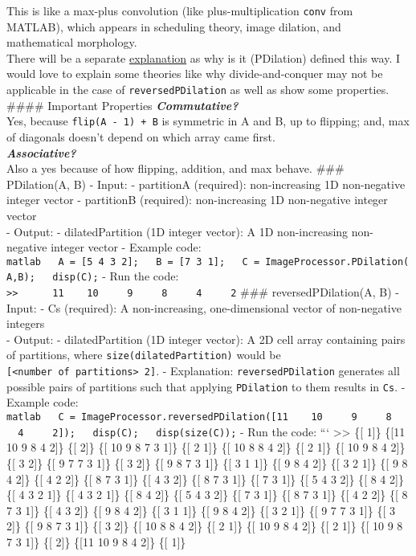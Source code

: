 \documentclass[11pt]{amsart}
\theoremstyle{remark}
\theoremstyle{definition}
\theoremstyle{remark}
\numberwithin{equation}{section}
\begin{document}
This is like a max-plus convolution (like plus-multiplication
\texttt{conv} from MATLAB), which appears in scheduling theory, image
dilation, and mathematical morphology.\\
There will be a separate
\href{https://github.com/zedttxj/Image-Processing-Tool-with-Matlab/blob/main/optional/PDilation-reversedPDilation.md}{explanation}
as why is it (PDilation) defined this way. I would love to explain some
theories like why divide-and-conquer may not be applicable in the case
of \texttt{reversedPDilation} as well as show some properties. \#\#\#\#
Important Properties \textbf{\emph{Commutative?}}\\
Yes, because \texttt{flip(A\ -\ 1)\ +\ B\textquotesingle{}} is symmetric
in A and B, up to flipping; and, max of diagonals doesn't depend on
which array came first.\\
\textbf{\emph{Associative?}}\\
Also a yes because of how flipping, addition, and max behave. \#\#\#
PDilation(A, B) - Input: - partitionA (required): non-increasing 1D
non-negative integer vector - partitionB (required): non-increasing 1D
non-negative integer vector\\
- Output: - dilatedPartition (1D integer vector): A 1D non-increasing
non-negative integer vector - Example code:
\texttt{matlab\ \ \ A\ =\ {[}5\ 4\ 3\ 2{]};\ \ \ B\ =\ {[}7\ 3\ 1{]};\ \ \ C\ =\ ImageProcessor.PDilation(A,B);\ \ \ disp(C);}
- Run the code:
\texttt{\textgreater{}\textgreater{}\ \ \ \ \ \ 11\ \ \ \ 10\ \ \ \ \ 9\ \ \ \ \ 8\ \ \ \ \ 4\ \ \ \ \ 2}
\#\#\# reversedPDilation(A, B) - Input: - Cs (required): A
non-increasing, one-dimensional vector of non-negative integers\\
- Output: - dilatedPartition (1D integer vector): A 2D cell array
containing pairs of partitions, where \texttt{size(dilatedPartition)}
would be
\texttt{{[}\textless{}number\ of\ partitions\textgreater{}\ 2{]}}. -
Explanation: \texttt{reversedPDilation} generates all possible pairs of
partitions such that applying \texttt{PDilation} to them results in
\texttt{Cs}. - Example code:
\texttt{matlab\ \ \ C\ =\ ImageProcessor.reversedPDilation({[}11\ \ \ \ 10\ \ \ \ \ 9\ \ \ \ \ 8\ \ \ \ \ 4\ \ \ \ \ 2{]});\ \ \ disp(C);\ \ \ disp(size(C));}
- Run the code: ``` \textgreater\textgreater{} \{{[} 1{]}\} \{{[}11 10 9
8 4 2{]}\} \{{[} 2{]}\} \{{[} 10 9 8 7 3 1{]}\} \{{[} 2 1{]}\} \{{[} 10
8 8 4 2{]}\} \{{[} 2 1{]}\} \{{[} 10 9 8 4 2{]}\} \{{[} 3 2{]}\} \{{[} 9
7 7 3 1{]}\} \{{[} 3 2{]}\} \{{[} 9 8 7 3 1{]}\} \{{[} 3 1 1{]}\} \{{[}
9 8 4 2{]}\} \{{[} 3 2 1{]}\} \{{[} 9 8 4 2{]}\} \{{[} 4 2 2{]}\} \{{[}
8 7 3 1{]}\} \{{[} 4 3 2{]}\} \{{[} 8 7 3 1{]}\} \{{[} 7 3 1{]}\} \{{[}
5 4 3 2{]}\} \{{[} 8 4 2{]}\} \{{[} 4 3 2 1{]}\} \{{[} 4 3 2 1{]}\}
\{{[} 8 4 2{]}\} \{{[} 5 4 3 2{]}\} \{{[} 7 3 1{]}\} \{{[} 8 7 3 1{]}\}
\{{[} 4 2 2{]}\} \{{[} 8 7 3 1{]}\} \{{[} 4 3 2{]}\} \{{[} 9 8 4 2{]}\}
\{{[} 3 1 1{]}\} \{{[} 9 8 4 2{]}\} \{{[} 3 2 1{]}\} \{{[} 9 7 7 3
1{]}\} \{{[} 3 2{]}\} \{{[} 9 8 7 3 1{]}\} \{{[} 3 2{]}\} \{{[} 10 8 8 4
2{]}\} \{{[} 2 1{]}\} \{{[} 10 9 8 4 2{]}\} \{{[} 2 1{]}\} \{{[} 10 9 8
7 3 1{]}\} \{{[} 2{]}\} \{{[}11 10 9 8 4 2{]}\} \{{[} 1{]}\}
\end{document}

